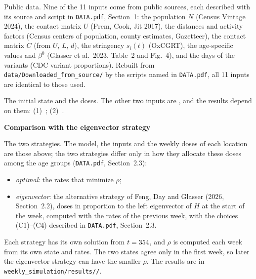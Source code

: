 \documentclass[10pt]{article}
\makeatletter
\renewcommand\paragraph{\@startsection{paragraph}{4}{\z@}{0.8ex \@plus 0.3ex}{-1em}%
  {\normalfont\normalsize\bfseries}}
\makeatother
\begin{document}
\paragraph{Public data.}
Nine of the 11 inputs come from public sources, each described with its source and script
in \texttt{DATA.pdf}, Section~1: the population $N$ (Census Vintage 2024), the contact
matrix $U$ (Prem, Cook, Jit 2017), the distances and activity factors (Census centers of
population, county estimates, Gazetteer), the contact matrix $C$ (from $U$, $L$, $d$), the
stringency $s_i(t)$ (OxCGRT), the age-specific values and $\beta^0$ (Glasser et al.\ 2023,
Table~2 and Fig.~4), and the days of the variants (CDC variant proportions). Rebuilt from
\texttt{data/Downloaded\_from\_source/} by the scripts named in \texttt{DATA.pdf}, all 11
inputs are identical to those used.

\paragraph{The initial state and the doses.}
The other two inputs are \RunOtherInputs, and the results depend on them:
(1)~\RunInitialText; (2)~\RunDosesText.


\begin{center}
{\large\bfseries Comparison with the eigenvector strategy}
\end{center}

\paragraph{The two strategies.}
The model, the inputs and the weekly doses of each location are those above; the two
strategies differ only in how they allocate these doses among the age groups
(\texttt{DATA.pdf}, Section~2.3):
\begin{itemize}
\item \emph{optimal}: the rates that minimize $\rho$;
\item \emph{eigenvector}: the alternative strategy of Feng, Day and Glasser (2026,
Section~2.2), doses in proportion to the left eigenvector of $H$ at the start of the week,
computed with the rates of the previous week, with the choices (C1)--(C4) described in
\texttt{DATA.pdf}, Section~2.3.
\end{itemize}
Each strategy has its own solution from $t=354$, and $\rho$ is computed each week from
its own state and rates. The two states agree only in the first week, so later the
eigenvector strategy can have the smaller $\rho$. The results are in
\texttt{weekly\_\allowbreak{}simulation/\allowbreak{}results/\allowbreak{}\RunTag/}.
\end{document}
